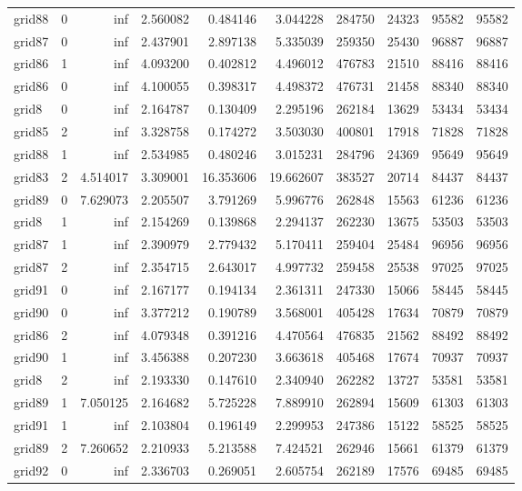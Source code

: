 \begin{longtable}{|l|r|r|r|r|r|r|r|r|r|}
grid88 & 0 & inf & 2.560082 & 0.484146 & 3.044228 & 284750 & 24323 & 95582 & 95582 \\
grid87 & 0 & inf & 2.437901 & 2.897138 & 5.335039 & 259350 & 25430 & 96887 & 96887 \\
grid86 & 1 & inf & 4.093200 & 0.402812 & 4.496012 & 476783 & 21510 & 88416 & 88416 \\
grid86 & 0 & inf & 4.100055 & 0.398317 & 4.498372 & 476731 & 21458 & 88340 & 88340 \\
grid8 & 0 & inf & 2.164787 & 0.130409 & 2.295196 & 262184 & 13629 & 53434 & 53434 \\
grid85 & 2 & inf & 3.328758 & 0.174272 & 3.503030 & 400801 & 17918 & 71828 & 71828 \\
grid88 & 1 & inf & 2.534985 & 0.480246 & 3.015231 & 284796 & 24369 & 95649 & 95649 \\
grid83 & 2 & 4.514017 & 3.309001 & 16.353606 & 19.662607 & 383527 & 20714 & 84437 & 84437 \\
grid89 & 0 & 7.629073 & 2.205507 & 3.791269 & 5.996776 & 262848 & 15563 & 61236 & 61236 \\
grid8 & 1 & inf & 2.154269 & 0.139868 & 2.294137 & 262230 & 13675 & 53503 & 53503 \\
grid87 & 1 & inf & 2.390979 & 2.779432 & 5.170411 & 259404 & 25484 & 96956 & 96956 \\
grid87 & 2 & inf & 2.354715 & 2.643017 & 4.997732 & 259458 & 25538 & 97025 & 97025 \\
grid91 & 0 & inf & 2.167177 & 0.194134 & 2.361311 & 247330 & 15066 & 58445 & 58445 \\
grid90 & 0 & inf & 3.377212 & 0.190789 & 3.568001 & 405428 & 17634 & 70879 & 70879 \\
grid86 & 2 & inf & 4.079348 & 0.391216 & 4.470564 & 476835 & 21562 & 88492 & 88492 \\
grid90 & 1 & inf & 3.456388 & 0.207230 & 3.663618 & 405468 & 17674 & 70937 & 70937 \\
grid8 & 2 & inf & 2.193330 & 0.147610 & 2.340940 & 262282 & 13727 & 53581 & 53581 \\
grid89 & 1 & 7.050125 & 2.164682 & 5.725228 & 7.889910 & 262894 & 15609 & 61303 & 61303 \\
grid91 & 1 & inf & 2.103804 & 0.196149 & 2.299953 & 247386 & 15122 & 58525 & 58525 \\
grid89 & 2 & 7.260652 & 2.210933 & 5.213588 & 7.424521 & 262946 & 15661 & 61379 & 61379 \\
grid92 & 0 & inf & 2.336703 & 0.269051 & 2.605754 & 262189 & 17576 & 69485 & 69485 \\

\end{longtable}
